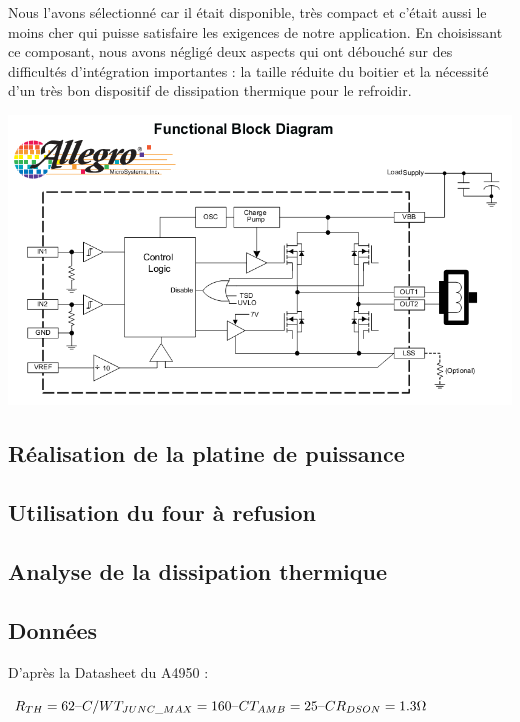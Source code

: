 \documentclass[11pt, french]{article} %
\begin{document}
\medskip
Nous l'avons sélectionné car il était disponible, très compact et c'était aussi le moins cher qui puisse satisfaire les exigences de notre application. En choisissant ce composant, nous avons négligé deux aspects qui ont débouché sur des difficultés d'intégration importantes : la taille réduite du boitier et la nécessité d'un très bon dispositif de dissipation thermique pour le refroidir.

\begin{center}
\includegraphics[width = 15cm]{SolutionAnalogique/A4950.png} 
\end{center}

\subsection{Réalisation de la platine de puissance}

\subsection{Utilisation du four à refusion}

\subsection{Analyse de la dissipation thermique}



\subsection{Données}

\noindent
D'après la Datasheet du A4950 :

\vspace{0.5cm}

\noindent
$ 
R_{TH} = 62 \char123C/W  \\
T_{JUNC\_MAX} = 160 \char123C  \\
T_{AMB} = 25\char123C  \\
R_{DSON} = 1.3 \Omega  \\
$
\end{document}
